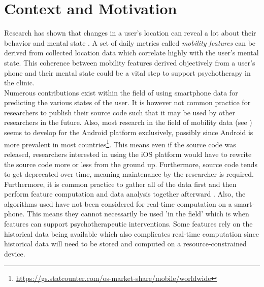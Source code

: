 \section{Context and Motivation}



Research has shown that changes in a user's location can reveal a lot about their behavior and mental state \cite{Saeb2015, Canzian2015, palmius2017, }. A set of daily metrics called \textit{mobility features} can be derived from collected location data which correlate highly with the user's mental state. This coherence between mobility features derived objectively from a user's phone and their mental state could be a vital step to support psychotherapy in the clinic.\\

Numerous contributions exist within the field of using smartphone data for predicting the various states of the user. It is however not common practice for researchers to publish their source code such that it may be used by other researchers in the future. Also, most research in the field of mobility data (see \cite{Saeb2015,  palmius2017, Canzian2015, extraction-of-behavioural-features}) seems to develop for the Android platform exclusively, possibly since Android is more prevalent in most countries\footnote{\url{https://gs.statcounter.com/os-market-share/mobile/worldwide}}. This means even if the source code was released, researchers interested in using the iOS platform would have to rewrite the source code more or less from the ground up. Furthermore, source code tends to get deprecated over time, meaning maintenance by the researcher is required. \\

Furthermore, it is common practice to gather all of the data first and then perform feature computation and data analysis together afterward \cite{Saeb2015, saeb2016, sparse-location-2014, extraction-of-behavioural-features}. Also, the algorithms used have not been considered for real-time computation on a smart-phone. This means they cannot necessarily be used 'in the field' which is when features can support psychotherapeutic interventions. Some features rely on the historical data being available which also complicates real-time computation since historical data will need to be stored and computed on a resource-constrained device.\\

